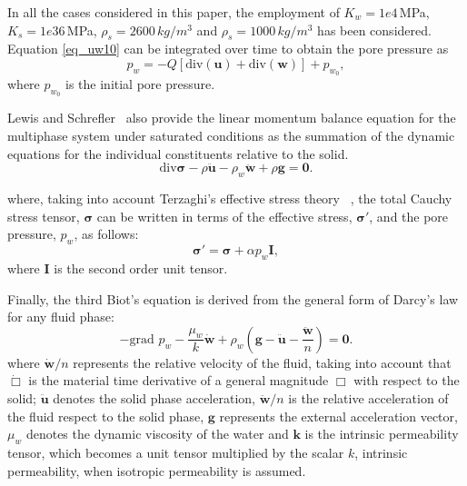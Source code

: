 \documentclass[preprint,12pt,a4paper]{elsarticle}
\begin{document}
In all the cases considered in this paper, the employment of $K_w=1e4\,$MPa, $K_s=1e36\,$MPa, $\rho_s=2600 \, kg/m^3$ and $\rho_s=1000 \, kg/m^3$ has been considered. Equation \eqref{eq_uw10} can be integrated over time to obtain the pore pressure as
\begin{equation}\label{eq_uw15}
p_w=-Q \left[ \mbox{div} (\boldsymbol{u}) + \mbox{div} (\boldsymbol{w}) \right] +p_{w_0},
\end{equation}
where $p_{w_0}$ is the initial pore pressure.

Lewis and Schrefler~\cite{LewisSchrefler98} also provide the linear momentum balance equation for the multiphase system under saturated conditions as the summation of the dynamic equations for the individual constituents relative to the solid.
\begin{equation}\label{eq_uw14}
\mbox{div}\boldsymbol{ \sigma} -\rho\boldsymbol{\ddot{u}} -\rho_w\boldsymbol{\ddot{w}}+\rho\boldsymbol{g}=\boldsymbol{0}.
\end{equation}


 where, taking into account Terzaghi's effective stress theory ~\cite{Terzaghi1925}, the total Cauchy stress tensor, $\boldsymbol{ \sigma}$ can be written in terms of the effective stress, $ \boldsymbol{ \sigma'}$, and the pore pressure, $p_w$, as follows:
\begin{equation}\label{eq_uw5}
 \boldsymbol{ \sigma'} =\boldsymbol{ \sigma} + \alpha p_{w}\textbf{I},
\end{equation}
where  $\textbf{I}$ is  the second order unit tensor.  

Finally, the third Biot's equation is derived from the general form of Darcy's law for any fluid phase:
\begin{equation}\label{eq_uw12}
-\mbox{grad }p_w -\frac{\mu_w}{k}\boldsymbol{\dot{w}}+ \rho_w \left (\boldsymbol{g}-\boldsymbol{\ddot{u}}-\frac{\boldsymbol{\ddot{w}}}{n} \right)=\boldsymbol{0}.
\end{equation}
where $\dot{\boldsymbol{w}}/n$ represents the relative velocity of the fluid, taking into account that $\dot\Box$ is the material time derivative of a general magnitude $\Box$ with respect to the solid; $\boldsymbol{\ddot{u}}$ denotes the solid phase acceleration, $\ddot{\boldsymbol{w}}/n$ is the relative acceleration of the fluid respect to the solid phase, $\boldsymbol{g}$ represents the external acceleration vector, $\mu_w$ denotes the dynamic viscosity of the water and $\boldsymbol{k}$ is the intrinsic permeability tensor, which becomes a unit tensor multiplied by the scalar $k$, intrinsic permeability, when isotropic permeability is assumed.
\end{document}
